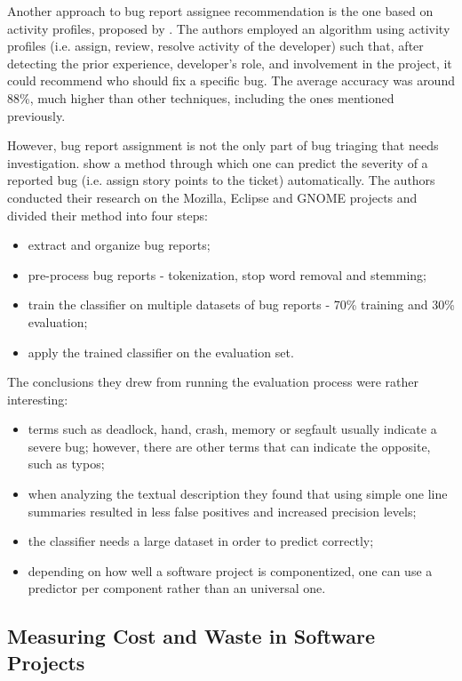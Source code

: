 \documentclass{mprop}
\begin{document}
Another approach to bug report assignee recommendation is the one based on
activity profiles, proposed by \citet{Naguib2013BugReportAssignee}. The authors 
employed an algorithm using activity profiles (i.e. assign, review, resolve 
activity of the developer) such that, after detecting the prior
experience, developer's role, and involvement in the project, it could
recommend who should fix a specific bug. The average accuracy was around
88\%, much higher than other techniques, including the ones mentioned previously. 

However, bug report assignment is not the only part of bug triaging that needs
investigation. \citet{lamkanfi2010predicting} show a method through which one
can predict the severity of a reported bug (i.e. assign story points to the 
ticket) automatically. The authors conducted their research on the Mozilla,
Eclipse and GNOME projects and divided their method into four steps:
  \begin{itemize}
    \item extract and organize bug reports;
    \item pre-process bug reports - tokenization, stop word removal and stemming;
    \item train the classifier on multiple datasets of bug reports - 70\% 
      training and 30\% evaluation;
    \item apply the trained classifier on the evaluation set.
  \end{itemize}
The conclusions they drew from running the evaluation process were rather 
interesting:
  \begin{itemize}
    \item terms such as deadlock, hand, crash, memory or segfault usually indicate
      a severe bug; however, there are other terms that can indicate the opposite,
      such as typos;
    \item when analyzing the textual description they found that using simple
      one line summaries resulted in less false positives and increased precision
      levels;
    \item the classifier needs a large dataset in order to predict correctly;
    \item depending on how well a software project is componentized, one can 
      use a predictor per component rather than an universal one.
  \end{itemize}

\subsection{Measuring Cost and Waste in Software Projects}\label{waste}
\end{document}
